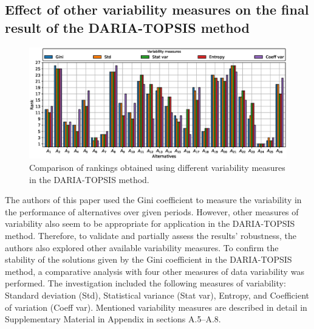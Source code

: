\documentclass[5p,times]{elsarticle}
\begin{document}
\subsection{Effect of other variability measures on the final result of the DARIA-TOPSIS method}
\label{sec:ResultsBenchmarkVarMeasures}
%
\begin{figure}[ht!]
    \centering
    \includegraphics[width=0.7\linewidth]{bar_chart_Variability_measures.eps}
    \caption{Comparison of rankings obtained using different variability measures in the DARIA-TOPSIS method.}
    \label{fig:compareVarMeasures}
\end{figure}
%
The authors of this paper used the Gini coefficient to measure the variability in the performance of alternatives over given periods. However, other measures of variability also seem to be appropriate for application in the DARIA-TOPSIS method. Therefore, to validate and partially assess the results' robustness, the authors also explored other available variability measures. To confirm the stability of the solutions given by the Gini coefficient in the DARIA-TOPSIS method, a comparative analysis with four other measures of data variability was performed. The investigation included the following measures of variability: Standard deviation (Std), Statistical variance (Stat var), Entropy, and Coefficient of variation (Coeff var). Mentioned variability measures are described in detail in Supplementary Material in Appendix in sections A.5--A.8.
%
\end{document}
